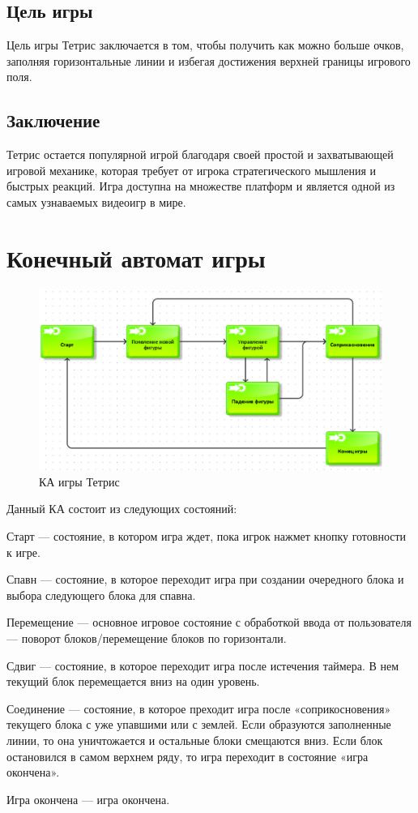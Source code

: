 \documentclass{article}
\begin{document}
\subsection*{Цель игры}
Цель игры Тетрис заключается в том, чтобы получить как можно больше очков, заполняя горизонтальные линии и избегая достижения верхней границы игрового поля.

\subsection*{Заключение}
Тетрис остается популярной игрой благодаря своей простой и захватывающей игровой механике, которая требует от игрока стратегического мышления и быстрых реакций. Игра доступна на множестве платформ и является одной из самых узнаваемых видеоигр в мире.

\section*{Конечный автомат игры}

\begin{figure}[h]
    \centering
    \includegraphics[width=1\textwidth]{../misc/images/fsm.png}
    \caption{КА игры Тетрис}
    \label{fig:example}
\end{figure}


Данный КА состоит из следующих состояний:

Старт — состояние, в котором игра ждет, пока игрок нажмет кнопку готовности к игре.

Спавн — состояние, в которое переходит игра при создании очередного блока и выбора следующего блока для спавна.

Перемещение — основное игровое состояние с обработкой ввода от пользователя — поворот блоков/перемещение блоков по горизонтали.

Сдвиг — состояние, в которое переходит игра после истечения таймера. В нем текущий блок перемещается вниз на один уровень.

Соединение — состояние, в которое преходит игра после «соприкосновения» текущего блока с уже упавшими или с землей. Если образуются заполненные линии, то она уничтожается и остальные блоки смещаются вниз. Если блок остановился в самом верхнем ряду, то игра переходит в состояние «игра окончена».

Игра окончена — игра окончена.
\end{document}

